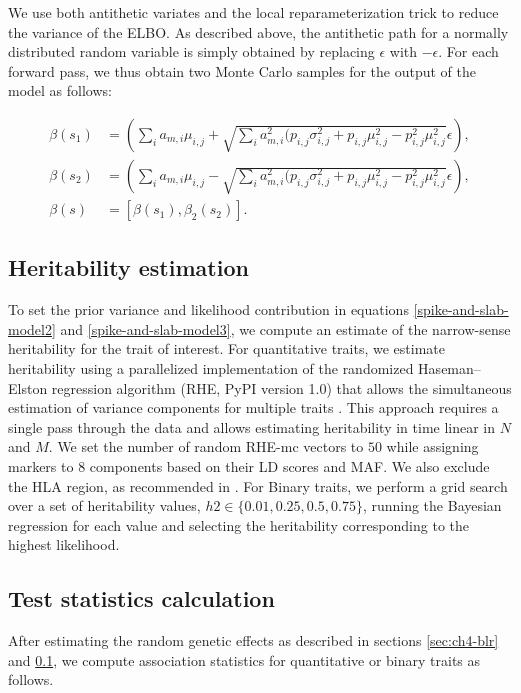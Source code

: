 %
We use both antithetic variates and the local reparameterization trick to reduce the variance of the ELBO.
%
As described above, the antithetic path for a normally distributed random variable is simply obtained by replacing $\epsilon$ with $-\epsilon$.
%
For each forward pass, we thus obtain two Monte Carlo samples for the output of the model as follows: 

\begin{align}
    \beta(s_1) &=  (\sum_{i}a_{m,i}\mu_{i,j} + \sqrt{\sum_{i}a^2_{m,i}(p_{i,j}\sigma^2_{i,j} + p_{i,j}\mu^2_{i,j} - p^2_{i,j}\mu^2_{i,j}} \epsilon ), \nonumber \\
    \beta(s_2) &= (\sum_{i}a_{m,i}\mu_{i,j} - \sqrt{\sum_{i}a^2_{m,i}(p_{i,j}\sigma^2_{i,j} + p_{i,j}\mu^2_{i,j} - p^2_{i,j}\mu^2_{i,j}} \epsilon ), \nonumber \\
    \beta(s) &= [\beta(s_1), \beta_2(s_2)].
\end{align}

\subsection{Heritability estimation}
\label{methods:h2}
%
To set the prior variance and likelihood contribution in equations \ref{spike-and-slab-model2} and \ref{spike-and-slab-model3}, we compute an estimate of the narrow-sense heritability for the trait of interest.
%
For quantitative traits, we estimate heritability using a parallelized implementation of the randomized Haseman–Elston regression algorithm\cite{wu2018scalable,pazokitoroudi2020efficient} (RHE, PyPI version 1.0) that allows the simultaneous estimation of variance components for multiple traits \cite{kalantzis2023thesis, zhu2024ARGRHE}.
%
This approach requires a single pass through the data and allows estimating heritability in time linear in $N$ and $M$.
%
We set the number of random RHE-mc vectors to $50$ while assigning markers to $8$ components based on their LD scores and MAF. 
%
We also exclude the HLA region, as recommended in \cite{pazokitoroudi2020efficient}.
%
For Binary traits, we perform a grid search over a set of heritability values, $h2 \in \{0.01, 0.25, 0.5, 0.75\}$, running the Bayesian regression for each value and selecting the heritability corresponding to the highest likelihood.
%


\subsection{Test statistics calculation}
\label{methods:test_stats}
%
After estimating the random genetic effects as described in sections \ref{sec:ch4-blr} and \ref{methods:h2}, we compute association statistics for quantitative or binary traits as follows.
%
